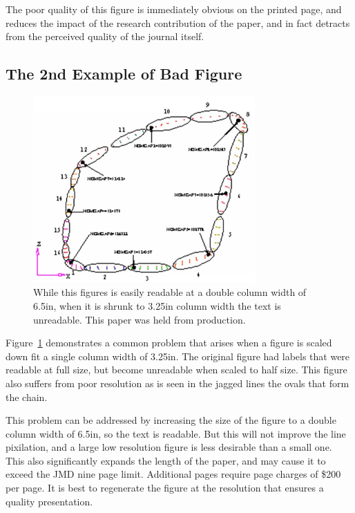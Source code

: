\documentclass[twocolumn,10pt,cleanfoot]{asme2ej}
\begin{document}
The poor quality of this figure is immediately obvious on the printed page, and reduces the impact of the research contribution of the paper, and in fact detracts from the perceived quality of the journal itself.



\subsection{The 2nd Example of Bad Figure}

\begin{figure} 
\centerline{\includegraphics[width=3.34in]{figure/FMANU_MD_05_1272_5.jpg}}
\caption{While this figures is easily readable at a double column width of 6.5in, when it is shrunk to 3.25in column width the text is unreadable. This paper was held from production.}
\label{fig_example2.jpg}
\end{figure}

Figure~\ref{fig_example2.jpg}
demonstrates a common problem that arises when a figure is scaled down fit a single column width of 3.25in.  The original figure had labels that were readable at full size, but become unreadable when scaled to half size.  This figure also suffers from poor resolution as is seen in the jagged lines the ovals that form the chain.

This problem can be addressed by increasing the size of the figure to a double column width of 6.5in, so the text is readable.  But this will not improve the line pixilation, and a large low resolution figure is less desirable than a small one.  This also significantly expands the length of the paper, and may cause it to exceed the JMD nine page limit.  Additional pages require page charges of \$200 per page.  It is best to regenerate the figure at the resolution that ensures a quality presentation.
\end{document}
